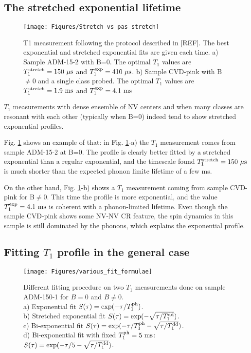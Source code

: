 \documentclass[a4paper,11pt]{report}
\begin{document}
\subsection{The stretched exponential lifetime}
\begin{figure}[h]
\centering
\texttt{[image: Figures/Stretch\_vs\_pas\_stretch]}
\caption{T1 measurement following the protocol described in [REF]. The best exponential and stretched exponential fits are given each time. a) Sample ADM-15-2 with B=0. The optimal $T_1$ values are $T_1^{\rm stretch}=150\ \mu \rm s$ and $T_1^{\rm exp}=410\ \mu \rm s$. b) Sample CVD-pink with B$\neq$0 and a single class probed. The optimal $T_1$ values are $T_1^{\rm stretch}=1.9\ \rm ms$ and $T_1^{\rm exp}=4.1\ \rm ms$}
\label{stretch_or_not_stretch}
\end{figure}
$T_1$ measurements with dense ensemble of NV centers and when many classes are resonant with each other (typically when B=0) indeed tend to show stretched exponential profiles.

Fig. \ref{stretch_or_not_stretch} shows an example of that: in Fig. \ref{stretch_or_not_stretch}-a) the $T_1$ measurement comes from sample ADM-15-2 at B=0. The profile is clearly better fitted by a stretched exponential than a regular exponential, and the timescale found $T_1^{\rm stretch}=150\ \mu \rm s$ is much shorter than the expected phonon limite lifetime of a few ms.

On the other hand, Fig. \ref{stretch_or_not_stretch}-b) shows a $T_1$ measurement coming from sample CVD-pink for B$\neq$0. This time the profile is more exponential, and the value $T_1^{\rm exp}=4.1\ \rm ms$ is coherent with a phonon-limited lifetime. Even though the sample CVD-pink shows some NV-NV CR feature, the spin dynamics in this sample is still dominated by the phonons, which explains the exponential profile.


\subsection{Fitting $T_1$ profile in the general case}

\begin{figure}[h]
\centering
\texttt{[image: Figures/various\_fit\_formulae]}
\caption{Different fitting procedure on two $T_1$ measurements done on sample ADM-150-1 for $B=0$ and $B\neq0$. \\ a) Exponential fit $S(\tau)=\exp (-\tau/T_1^{\rm ph})$. \\ b) Stretched exponential fit $S(\tau)=\exp (-\sqrt{\tau/T_1^{\rm dd}})$. \\ c) Bi-exponential fit $S(\tau)=\exp (-\tau/T_1^{\rm ph} -\sqrt{\tau/T_1^{\rm dd}})$. \\ d) Bi-exponential fit with fixed $T_1^{\rm ph}=5\ \rm ms$: $S(\tau)=\exp (-\tau/5 -\sqrt{\tau/T_1^{\rm dd}})$.}
\label{various_fit_formulae}
\end{figure}
\end{document}
